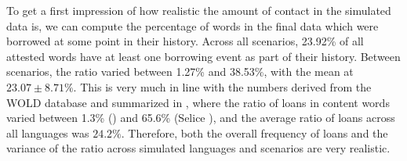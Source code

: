 To get a first impression of how realistic the amount of contact in the simulated data is, we can compute the percentage of words in the final data which were borrowed at some point in their history. Across all scenarios, 23.92\% of all attested words have at least one borrowing event as part of their history. Between scenarios, the ratio varied between 1.27\% and 38.53\%, with the mean at $23.07 \pm 8.71\%$. This is very much in line with the numbers derived from the WOLD database and summarized in \cite{tadmor2009}, where the ratio of loans in content words varied between 1.3\% () and 65.6\% (Selice ), and the average ratio of loans across all languages was $24.2\%$. Therefore, both the overall frequency of loans and the variance of the ratio across simulated languages and scenarios are very realistic.

